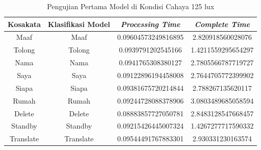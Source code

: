 \begin{longtable}{|c|c|c|c|}
  \caption{Pengujian Pertama Model di Kondisi Cahaya 125 lux}
  \label{tb:prediksiterang1}                                   \\
  \hline
  \rowcolor[HTML]{C0C0C0}
  \textbf{Kosakata} & \textbf{Klasifikasi Model} & \textbf{\emph{Processing Time}} & \textbf{\emph{Complete Time}}\\
  \hline
  Maaf              & Maaf                        & 0.09604573249816895                           & 2.820918560028076                                  \\
  Tolong            & Tolong                        & 0.0939791202545166                           & 1.4211559295654297                                  \\
  Nama              & Nama                        & 0.0941765308380127                           & 2.7805566787719727                                  \\
  Saya              & Saya                        & 0.09122896194458008                           & 2.7644705772399902                                  \\
  Siapa              & Siapa                        & 0.09381675720214844                           & 2.788267135620117                                  \\
  Rumah             & Rumah                        & 0.09244728088378906                           & 3.0803489685058594                                  \\
  Delete            & Delete                        & 0.08883857727050781                           & 2.8483128547668457                                  \\
  Standby           & Standby                        & 0.09215426445007324                           & 1.4267277717590332                                  \\
  Translate         & Translate                        & 0.09544491767883301                           & 2.930331230163574                                  \\
  \hline
\end{longtable}

